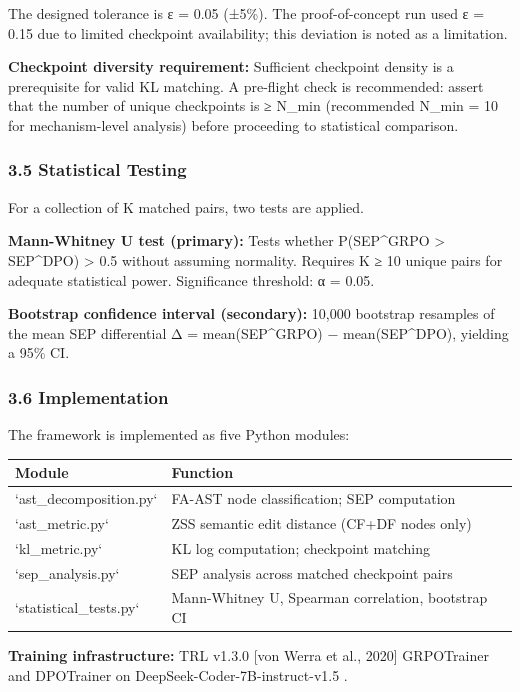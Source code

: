 The designed tolerance is ε = 0.05 (±5\%). The proof-of-concept run used ε = 0.15 due to limited checkpoint availability; this deviation is noted as a limitation.

\textbf{Checkpoint diversity requirement:} Sufficient checkpoint density is a prerequisite for valid KL matching. A pre-flight check is recommended: assert that the number of unique checkpoints is ≥ N_min (recommended N_min = 10 for mechanism-level analysis) before proceeding to statistical comparison.

\subsubsection{3.5 Statistical Testing}

For a collection of K matched pairs, two tests are applied.

\textbf{Mann-Whitney U test (primary):} Tests whether P(SEP^GRPO > SEP^DPO) > 0.5 without assuming normality. Requires K ≥ 10 unique pairs for adequate statistical power. Significance threshold: α = 0.05.

\textbf{Bootstrap confidence interval (secondary):} 10,000 bootstrap resamples of the mean SEP differential Δ = mean(SEP^GRPO) − mean(SEP^DPO), yielding a 95\% CI.

\subsubsection{3.6 Implementation}

The framework is implemented as five Python modules:

\begin{table}[htbp]
\centering
\begin{tabular}{ll}
\toprule
Module & Function \\
\midrule
`ast_decomposition.py` & FA-AST node classification; SEP computation \\
`ast_metric.py` & ZSS semantic edit distance (CF+DF nodes only) \\
`kl_metric.py` & KL log computation; checkpoint matching \\
`sep_analysis.py` & SEP analysis across matched checkpoint pairs \\
`statistical_tests.py` & Mann-Whitney U, Spearman correlation, bootstrap CI \\
\bottomrule
\end{tabular}
\end{table}

\textbf{Training infrastructure:} TRL v1.3.0 [von Werra et al., 2020] GRPOTrainer and DPOTrainer on DeepSeek-Coder-7B-instruct-v1.5 \citep{Guoetal2024}.

